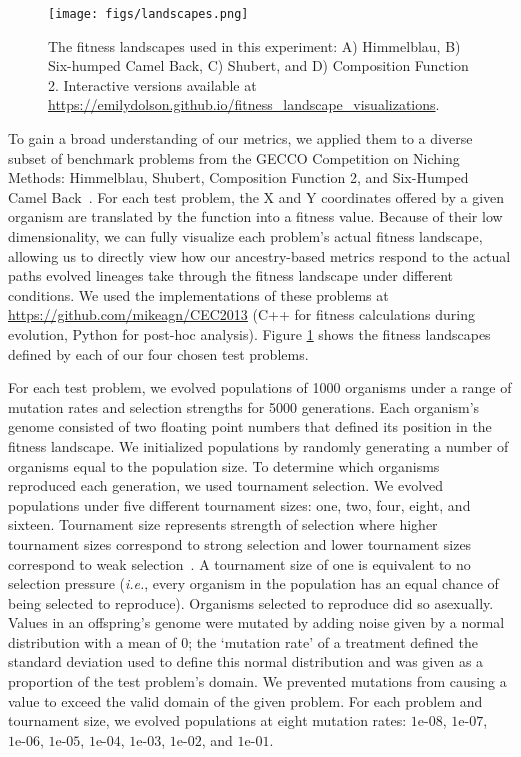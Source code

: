\documentclass[letterpaper]{article}
\newcommand{\reduceCaptionPadding}{\setlength{\belowcaptionskip}{-10pt}}
\begin{document}
\begin{figure}
\centering
\texttt{[image: figs/landscapes.png]}
\reduceCaptionPadding
\caption{\small The fitness landscapes used in this experiment: A) Himmelblau, B) Six-humped Camel Back, C) Shubert, and D) Composition Function 2. Interactive versions available at \url{https://emilydolson.github.io/fitness_landscape_visualizations}.}
\label{fig:landscapes}
\end{figure}

To gain a broad understanding of our metrics, we applied them to a diverse subset of benchmark problems from the GECCO Competition on Niching Methods: Himmelblau, Shubert, Composition Function 2, and Six-Humped Camel Back~\citep{li_benchmark_2013}. For each test problem, the X and Y coordinates offered by a given organism are translated by the function into a fitness value. Because of their low dimensionality, we can fully visualize each problem's actual fitness landscape, allowing us to directly view how our ancestry-based metrics respond to the actual paths evolved lineages take through the fitness landscape under different conditions. We used the implementations of these problems at \url{https://github.com/mikeagn/CEC2013} (C++ for fitness calculations during evolution, Python for post-hoc analysis). Figure \ref{fig:landscapes} shows the fitness landscapes defined by each of our four chosen test problems.

For each test problem, we evolved populations of 1000 organisms under a range of mutation rates and selection strengths for 5000 generations. Each organism's genome consisted of two floating point numbers that defined its position in the fitness landscape. We initialized populations by randomly generating a number of organisms equal to the population size. To determine which organisms reproduced each generation, we used tournament selection. We evolved populations under five different tournament sizes: one, two, four, eight, and sixteen. Tournament size represents strength of selection where higher tournament sizes correspond to strong selection and lower tournament sizes correspond to weak selection~\citep{blickle1995mathematical}. A tournament size of one is equivalent to no selection pressure (\textit{i.e.}, every organism in the population has an equal chance of being selected to reproduce). Organisms selected to reproduce did so asexually. Values in an offspring's genome were mutated by adding noise given by a normal distribution with a mean of 0; the `mutation rate' of a treatment defined the standard deviation used to define this normal distribution and was given as a proportion of the test problem's domain. We prevented mutations from causing a value to exceed the valid domain of the given problem. For each problem and tournament size, we evolved populations at eight mutation rates: $1\text{e-}08$, $1\text{e-}07$, $1\text{e-}06$, $1\text{e-}05$, $1\text{e-}04$, $1\text{e-}03$, $1\text{e-}02$, and $1\text{e-}01$. 
\end{document}
